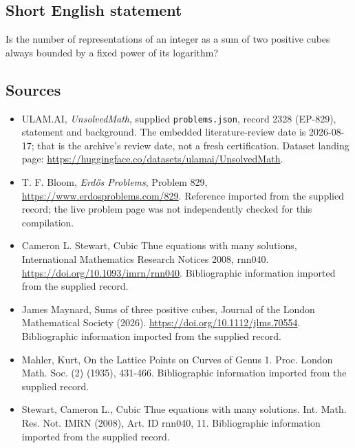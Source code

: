 \documentclass[11pt,a4paper]{article}
\begin{document}
\subsection{Short English statement}

Is the number of representations of an integer as a sum of two positive cubes always bounded by a fixed power of its logarithm?

\subsection{Sources}

{\small

\begin{itemize}

\item[\hypertarget{source:2328:1}{S1}] ULAM.AI, \emph{UnsolvedMath}, supplied \texttt{problems.json}, record 2328 (EP-829), statement and background. The embedded literature-review date is 2026-08-17; that is the archive’s review date, not a fresh certification. Dataset landing page: \url{https://huggingface.co/datasets/ulamai/UnsolvedMath}.

\item[\hypertarget{source:2328:2}{S2}] T. F. Bloom, \emph{Erdős Problems}, Problem 829, \url{https://www.erdosproblems.com/829}. Reference imported from the supplied record; the live problem page was not independently checked for this compilation.

\item[\hypertarget{source:2328:3}{S3}] Cameron L. Stewart, Cubic Thue equations with many solutions, International Mathematics Research Notices 2008, rnn040. \url{https://doi.org/10.1093/imrn/rnn040}. Bibliographic information imported from the supplied record.

\item[\hypertarget{source:2328:4}{S4}] James Maynard, Sums of three positive cubes, Journal of the London Mathematical Society (2026). \url{https://doi.org/10.1112/jlms.70554}. Bibliographic information imported from the supplied record.

\item[\hypertarget{source:2328:5}{S5}] Mahler, Kurt, On the Lattice Points on Curves of Genus 1. Proc. London Math. Soc. (2) (1935), 431-466. Bibliographic information imported from the supplied record.

\item[\hypertarget{source:2328:6}{S6}] Stewart, Cameron L., Cubic {T}hue equations with many solutions. Int. Math. Res. Not. IMRN (2008), Art. ID rnn040, 11. Bibliographic information imported from the supplied record.

\end{itemize}

}

\label{end:2328}
\end{document}
